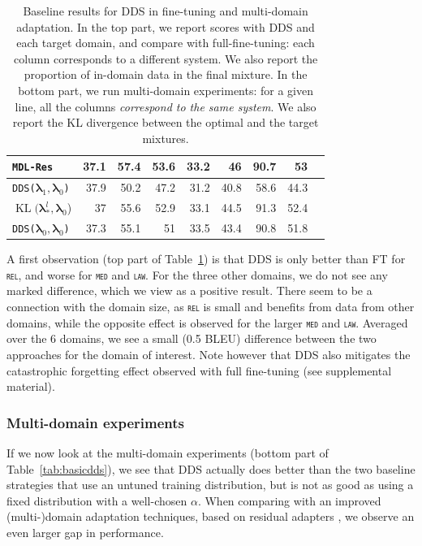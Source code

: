 \documentclass[11pt,a4paper]{article}
\newcommand{\fyTodo}[1]{\Todo[FY:]{\textcolor{orange}{#1}}}
\newcommand{\domain}[1]{\texttt{\textsc{#1}}}
\newcommand{\system}[1]{\texttt{{#1}}}
\newcommand{\vlambda}{\ensuremath{\boldsymbol\lambda}\xspace} %
\begin{document}
\begin{table}
\begin{tabular}{|l|*8{r|}}
    \system{MDL-Res} &37.1&57.4&53.6&33.2&46&90.7&53\\\hline
    \system{DDS($\vlambda_1, \vlambda_0$)} &37.9&50.2&47.2&31.2&40.8&58.6&44.3\\
    $\operatorname{KL}(\vlambda_*^{l}, \vlambda_0$) &37&55.6&52.9&33.1&44.5&91.3&52.4 \\
    \system{DDS($\vlambda_0, \vlambda_0$)} &37.3&55.1&51&33.5&43.4&90.8&51.8\\ \hline
  \end{tabular}
  \caption{Baseline results for DDS in fine-tuning and multi-domain adaptation. In the top part, we report scores with DDS and each target domain, and compare with full-fine-tuning: each column corresponds to a different system. We also report the proportion of in-domain data in the final mixture. In the bottom part, we run multi-domain experiments: for a given line, all the columns \emph{correspond to the same system}. We also report the KL divergence between the optimal and the target mixtures.}
  \label{tab:basic-dds}
\end{table}

A first observation (top part of Table~\ref{tab:basic-dds}) is that DDS is only better than FT for \domain{rel}, and worse for \domain{med} and \domain{law}. For the three other domains, we do not see any marked difference, which we view as a positive result. There seem to be a connection with the domain size, as \domain{rel} is small and benefits from data from other domains, while the opposite effect is observed for the larger \domain{med} and \domain{law}. Averaged over the 6 domains, we see a small (0.5 BLEU) difference between the two approaches for the domain of interest. Note however that DDS also mitigates the catastrophic forgetting effect observed with full fine-tuning (see supplemental material).\fyTodo{Supplementary}

\subsubsection{Multi-domain experiments}

If we now look at the multi-domain experiments (bottom part of Table~\ref{tab:basicdds}), we see that DDS actually does better than the two baseline strategies that use an untuned training distribution, but is not as good as using a fixed distribution with a well-chosen $\alpha$. When comparing with an improved (multi-)domain adaptation techniques, based on residual adapters \cite{Bapna19simple,Pham20astudy}, we observe an even larger gap in performance.
\end{document}
